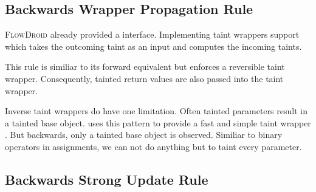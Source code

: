\documentclass[../draft.tex]{subfiles}
\begin{document}
    \subsection{Backwards Wrapper Propagation Rule}
    \textsc{FlowDroid} already provided a  interface. Implementing taint wrappers support  which takes the outcoming taint as an input and computes the incoming taints.

    This rule is similiar to its forward equivalent but enforces a reversible taint wrapper. Consequently, tainted return values are also passed into the taint wrapper.

    Inverse taint wrappers do have one limitation. Often tainted parameters result in a tainted base object.  uses this pattern to provide a fast and simple taint wrapper \cite{Arzt2017PhD}. But backwards, only a tainted base object is observed. Similiar to binary operators in assignments, we can not do anything but to taint every parameter.


    \subsection{Backwards Strong Update Rule}
\end{document}
